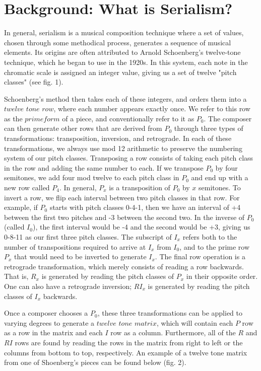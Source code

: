 \section{Background: What is Serialism?}

In general, serialism is a musical composition technique where a set of values, chosen through some methodical process, 
generates a sequence of musical elements. Its origins are often attributed to Arnold Schoenberg's twelve-tone technique, which
he began to use in the 1920s. In this system, each note in the chromatic scale is assigned an integer value, giving us a set of twelve
"pitch classes" (see fig. 1).

Schoenberg's method then takes each of these integers, and orders them into a $twelve$ $tone$ $row$, where each number appears exactly once. We refer to this row as the $prime form$ of a piece, and conventionally refer to it as $P_0$. The 
composer can then generate other rows that are derived from $P_0$ through three types of transformations:
transposition, inversion, and retrograde. In each of these transformations, we always use mod 12 arithmetic to preserve the 
numbering system of our pitch classes. Transposing a row consists of taking each pitch class in the row and adding the same number 
to each. If we transpose $P_0$ by four semitones, we add four mod twelve to each pitch class in $P_0$ and end up with a new row 
called $P_4$. In general, $P_x$ is a transposition of $P_0$ by $x$ semitones. To invert a row, we flip each interval between two 
pitch classes in that row. For example, if $P_0$ starts with pitch classes 0-4-1, then we have an interval of +4 between the first two 
pitches and -3 between the second two. In the inverse of $P_0$ (called $I_0$), the first interval would be -4 and the second would 
be +3, giving us 0-8-11 as our first three pitch classes. The subscript of $I_x$  refers both to the number of transpositions required 
to arrive at $I_x$ from $I_0$, and to the prime row $P_x$ that would need to be inverted to generate $I_x$. The final row 
operation is a retrograde transformation, which merely consists of reading a row backwards. That is, $R_x$ is generated by reading 
the pitch classes of $P_x$ in their opposite order. One can also have a retrograde inversion; $RI_x$ is generated by reading the 
pitch classes of $I_x$ backwards.

Once a composer chooses a $P_0$, these three transformations can be applied to varying degrees to generate a $twelve$ $tone$ 
$matrix$, which will contain each $P$ row as a row in the matrix and each $I$ row as a column. Furthermore, all of the $R$ and $RI$ 
rows are found by reading the rows in the matrix from right to left or the columns from bottom to top, respectively. An example of a 
twelve tone matrix from one of Shoenberg's pieces can be found below (fig. 2).


